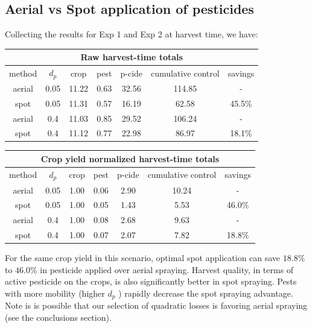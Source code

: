 \documentclass[11pt]{article}
\begin{document}
\subsection{Aerial vs Spot application of pesticides}

Collecting the results for Exp 1 and Exp 2 at harvest time, we have:

\begin{center}
	\begin{tabular}{ | c | c | c| c| c| c| c| }
	\hline
	\multicolumn{7}{|c|}{Raw harvest-time totals} \\
	\hline
    method & $d_p$ & crop & pest & p-cide & cumulative control & savings \\
    \hline
    aerial & 0.05 & 11.22 & 0.63 & 32.56 & 114.85 & - \\
    \hline
    spot & 0.05 & 11.31 & 0.57 & 16.19 & 62.58 & 45.5\% \\
    \hline
    aerial & 0.4 & 11.03 & 0.85 & 29.52 & 106.24 & - \\
    \hline
    spot & 0.4 & 11.12 & 0.77 & 22.98 & 86.97 & 18.1\% \\
    \hline
    \end{tabular}
\end{center}

\begin{center}
	\begin{tabular}{ | c | c | c| c| c| c| c| }
	\hline
	\multicolumn{7}{|c|}{Crop yield normalized harvest-time totals} \\
	\hline
    method & $d_p$ & crop & pest & p-cide & cumulative control & savings \\
    \hline
    aerial & 0.05 & 1.00 & 0.06 & 2.90 & 10.24 & - \\
    \hline
    spot & 0.05 & 1.00 & 0.05 & 1.43 & 5.53 & 46.0\% \\
    \hline
    aerial & 0.4 & 1.00 & 0.08 & 2.68 & 9.63 & - \\
    \hline
    spot & 0.4 & 1.00 & 0.07 & 2.07 & 7.82 & 18.8\% \\
    \hline
    \end{tabular}
\end{center}

For the same crop yield in this scenario, optimal spot application can save $18.8\%$ to $46.0\%$ in pesticide applied over aerial spraying. Harvest quality, in terms of active pesticide on the crops, is also significantly better in spot spraying. Pests with more mobility (higher $d_p$ ) rapidly decrease the spot spraying advantage. Note is is possible that our selection of quadratic losses is favoring aerial spraying (see the conclusions section).
\end{document}

